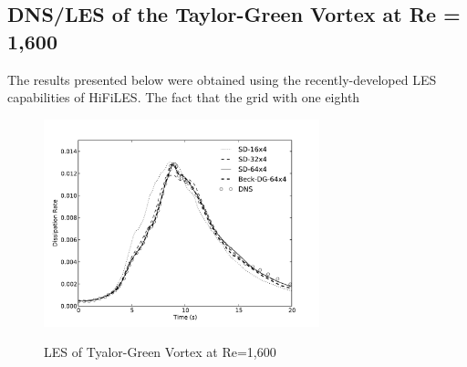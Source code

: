\graphicspath{{figures_taylorgreen/}}%



\subsection{DNS/LES of the Taylor-Green Vortex at Re = 1,600}
The results presented below were obtained using the recently-developed LES capabilities of HiFiLES. The fact that the grid with one eighth 
\begin{figure}
\centering
\includegraphics[height=60mm]{dissrate-hex-mesh-small.pdf} \\
\caption{LES of Tyalor-Green Vortex at Re=1,600\cite{bull2013a}}
\label{fig:setup}
\end{figure}

